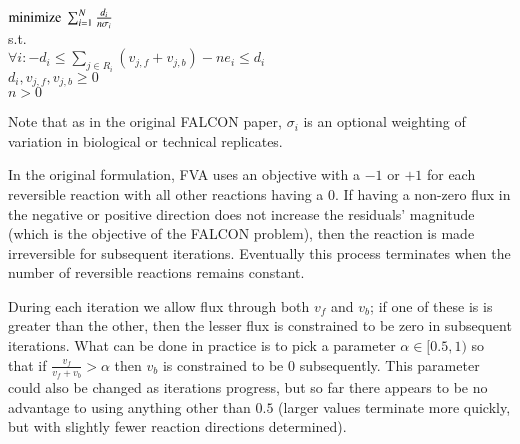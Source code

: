 \begin{methods}
\pagebreak
\begin{Algorithm}[FALCON]
\label{alg:FALCON}
\begin{algorithmic}
  \ELSE 
  \ENDIF
  \INDSTATE $\textnormal{minimize}\ \sum^N_{i=1}\frac{d_i}{n \sigma_i}$  \\
  \INDSTATE s.t. \\
  \INDSTATE $\forall i: -d_i \leq \sum_{j \in R_i}(v_{j,f} + v_{j,b}) - n e_i \leq d_i$ \\
  \INDSTATE $d_i, v_{j,f}, v_{j,b} \geq 0$ \\
  \INDSTATE $n > 0$
  \ENDIF
  \ENDIF
  \ENDFOR
\ENDWHILE
\end{algorithmic}
\end{Algorithm}
Note that as in the original FALCON paper, $\sigma_i$ is an optional weighting of variation
in biological or technical replicates. 

In the original formulation, FVA uses an objective with a $-1$ or $+1$ for each reversible reaction 
with all other reactions having a 0. If having a non-zero flux in the negative or positive direction
does not increase the residuals' magnitude (which is the objective of the FALCON problem), then 
the reaction is made irreversible for subsequent iterations. Eventually this process terminates
when the number of reversible reactions remains constant. 

During each iteration we allow flux through both $v_f$ and $v_b$; if one of these is is greater 
than the other, then the lesser flux is constrained to be zero in subsequent iterations. What
can be done in practice is to pick a parameter $\alpha \in [0.5,1)$ so that if
$\frac{v_f}{v_f+v_b} > \alpha$ then $v_b$ is constrained to be 0 subsequently. This parameter could
also be changed as iterations progress, but so far there appears to be no advantage to using
anything other than $0.5$ (larger values terminate more quickly, but with slightly fewer reaction
directions determined).


\end{methods}
